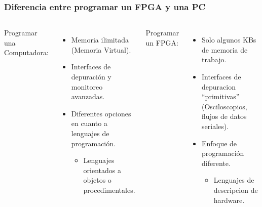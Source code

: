 \frame
{
  \frametitle{Diferencia entre programar un FPGA y una PC}
  \begin{columns}
	Programar una Computadora: %
		\begin{itemize}
			\item Memoria ilimitada (Memoria Virtual). %
			\item Interfaces de depuraci\'on y monitoreo avanzadas. %
			\item Diferentes opciones en cuanto a lenguajes de programaci\'on. %
			\begin{itemize}
				\item Lenguajes orientados a objetos o procedimentales. %
			\end{itemize}
		\end{itemize}
	Programar un FPGA: %
		\begin{itemize}
			\item Solo algunos KBs de memoria de trabajo. %
			\item Interfaces de depuracion ``primitivas'' (Osciloscopios, flujos de datos seriales). %
			\item Enfoque de programaci\'on diferente. %
			\begin{itemize}
				\item Lenguajes de descripcion de hardware. %
			\end{itemize}			
		\end{itemize}    
	\end{columns}		  
}


